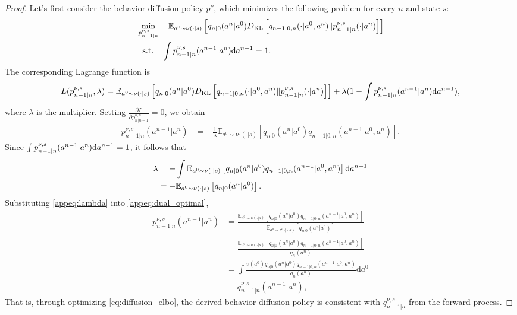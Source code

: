 \begin{proof}
Let's first consider the behavior diffusion policy $p^\nu$, which minimizes the following problem for every $n$ and state $s$:
$$
\begin{aligned}
        &\min_{p^{\nu,s}_{n-1|n}}\quad \mathbb{E}_{a^0\sim\nu(\cdot|s)}\left[q_{n|0}(a^n|a^0)D_{\rm KL}\left[q_{n-1|0,n}(\cdot|a^0, a^n)\|p_{n-1|n}^{\nu,s}(\cdot|a^n)\right]\right]\\
        &\ \ \textrm{s.t.}\quad \int p_{n-1|n}^{\nu,s}(a^{n-1}|a^n)\mathrm{d} a^{n-1}=1.
    \end{aligned}
$$
The corresponding Lagrange function is
\begin{equation}
\begin{aligned}
    L(p^{\nu,s}_{n-1|n}, \lambda)&=\mathbb{E}_{a^0\sim\nu(\cdot|s)}\left[q_{n|0}(a^n|a^0)D_{\rm KL}\left[q_{n-1|0,n}(\cdot|a^0, a^n)\|p_{n-1|n}^{\nu,s}(\cdot|a^n)\right]\right]+\lambda (1-\int p_{n-1|n}^{\nu,s}(a^{n-1}|a^n)\mathrm{d} a^{n-1}),\\
\end{aligned}
\end{equation}
where $\lambda$ is the multiplier. Setting $\frac{\partial L}{\partial p_{n|n-1}^{\nu, s}}=0$, we obtain
\begin{equation}\label{appeq:dual_optimal}
\begin{aligned}
    p^{\nu,s}_{n-1|n}(a^{n-1}|a^n)&=-\frac 1 \lambda \mathbb{E}_{a^0\sim \nu^0(\cdot|s)}\left[q_{n|0}(a^n|a^0)q_{n-1|0,n}(a^{n-1}|a^0, a^n)\right].
\end{aligned}
\end{equation}
Since $\int p_{n-1|n}^{\nu,s}(a^{n-1}|a^n)\mathrm{d} a^{n-1}=1$, it follows that
\begin{equation}\label{appeq:lambda}
\begin{aligned}
    \lambda &= -\int \mathbb{E}_{a^0\sim \nu(\cdot|s)}\left[q_{n|0}(a^n|a^0)q_{n-1|0,n}(a^{n-1}|a^0, a^n)\right]\mathrm{d} a^{n-1}\\
    &=-\mathbb{E}_{a^0\sim \nu(\cdot|s)}\left[q_{n|0}(a^n|a^0)\right].
\end{aligned}
\end{equation}
Substituting \eqref{appeq:lambda} into \eqref{appeq:dual_optimal},
\begin{equation}
    \begin{aligned}
        p^{\nu,s}_{n-1|n}(a^{n-1}|a^n)&=\frac{\mathbb{E}_{a^0\sim \nu(\cdot|s)}\left[q_{n|0}(a^n|a^0)q_{n-1|0,n}(a^{n-1}|a^0, a^n)\right]}{\mathbb{E}_{a^0\sim \nu^0(\cdot|s)}\left[q_{n|0}(a^n|a^0)\right]}\\
        &=\frac{\mathbb{E}_{a^0\sim \nu(\cdot|s)}\left[q_{n|0}(a^n|a^0)q_{n-1|0,n}(a^{n-1}|a^0, a^n)\right]}{q_n(a^n)}\\
        &=\int \frac{v(a^0)q_{n|0}(a^n|a^0)q_{n-1|0, n}(a^{n-1}|a^0, a^n)}{q_n(a^n)}\mathrm{d} a^0\\
        &=q_{n-1|n}^{\nu, s}(a^{n-1}|a^n),
    \end{aligned}
\end{equation}
That is, through optimizing \eqref{eq:diffusion_elbo}, the derived behavior diffusion policy is consistent with $q_{n-1|n}^{\nu, s}$ from the forward process. 


\end{proof}
